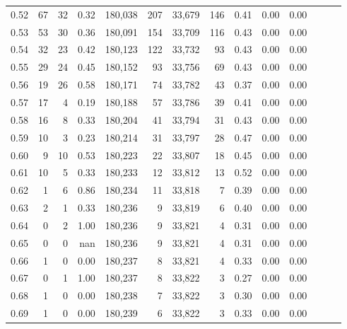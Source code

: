 \begin{tabular}{rrrrrrrrrrrrrr}
0.52 &      67 &     32 &  0.32 &  180,038 &      207 &  33,679 &     146 &  0.41 &  0.00 &      0.00 \\
0.53 &      53 &     30 &  0.36 &  180,091 &      154 &  33,709 &     116 &  0.43 &  0.00 &      0.00 \\
0.54 &      32 &     23 &  0.42 &  180,123 &      122 &  33,732 &      93 &  0.43 &  0.00 &      0.00 \\
0.55 &      29 &     24 &  0.45 &  180,152 &       93 &  33,756 &      69 &  0.43 &  0.00 &      0.00 \\
0.56 &      19 &     26 &  0.58 &  180,171 &       74 &  33,782 &      43 &  0.37 &  0.00 &      0.00 \\
0.57 &      17 &      4 &  0.19 &  180,188 &       57 &  33,786 &      39 &  0.41 &  0.00 &      0.00 \\
0.58 &      16 &      8 &  0.33 &  180,204 &       41 &  33,794 &      31 &  0.43 &  0.00 &      0.00 \\
0.59 &      10 &      3 &  0.23 &  180,214 &       31 &  33,797 &      28 &  0.47 &  0.00 &      0.00 \\
0.60 &       9 &     10 &  0.53 &  180,223 &       22 &  33,807 &      18 &  0.45 &  0.00 &      0.00 \\
0.61 &      10 &      5 &  0.33 &  180,233 &       12 &  33,812 &      13 &  0.52 &  0.00 &      0.00 \\
0.62 &       1 &      6 &  0.86 &  180,234 &       11 &  33,818 &       7 &  0.39 &  0.00 &      0.00 \\
0.63 &       2 &      1 &  0.33 &  180,236 &        9 &  33,819 &       6 &  0.40 &  0.00 &      0.00 \\
0.64 &       0 &      2 &  1.00 &  180,236 &        9 &  33,821 &       4 &  0.31 &  0.00 &      0.00 \\
0.65 &       0 &      0 &   nan &  180,236 &        9 &  33,821 &       4 &  0.31 &  0.00 &      0.00 \\
0.66 &       1 &      0 &  0.00 &  180,237 &        8 &  33,821 &       4 &  0.33 &  0.00 &      0.00 \\
0.67 &       0 &      1 &  1.00 &  180,237 &        8 &  33,822 &       3 &  0.27 &  0.00 &      0.00 \\
0.68 &       1 &      0 &  0.00 &  180,238 &        7 &  33,822 &       3 &  0.30 &  0.00 &      0.00 \\
0.69 &       1 &      0 &  0.00 &  180,239 &        6 &  33,822 &       3 &  0.33 &  0.00 &      0.00 \\

\end{tabular}
